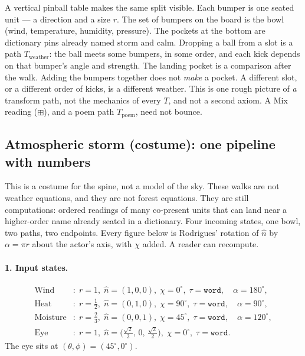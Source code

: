 \documentclass[12pt, a4paper]{article}
\begin{document}
A vertical pinball table makes the same split visible. Each bumper
is one seated unit --- a direction and a size \(r\). The set of
bumpers on the board is the bowl (wind, temperature, humidity,
pressure). The pockets at the bottom are dictionary pins already
named \(\mathrm{storm}\) and \(\mathrm{calm}\). Dropping a ball from
a slot is a path \(T_{\mathrm{weather}}\): the ball meets some
bumpers, in some order, and each kick depends on that bumper's
angle and strength. The landing pocket is a comparison after the
walk. Adding the bumpers together does not \emph{make} a pocket.
A different slot, or a different order of kicks, is a different
weather. This is one rough picture of \emph{a} transform path, not
the mechanics of every $T$, and not a second axiom. A Mix reading ($\boxplus$), and a poem path $T_{\mathrm{poem}}$, need not bounce.

\subsection{Atmospheric storm (costume): one pipeline with numbers}
\label{subsec:storm_pipeline}
This is a costume for the spine, not a model of the sky.
These walks are not weather equations, and they are not forest
equations. They are still computations: ordered readings of many
co-present units that can land near a higher-order name already
seated in a dictionary.
Four incoming
states, one bowl, two paths, two endpoints. Every figure below is
Rodrigues' rotation of $\hat n$ by $\alpha=\pi r$ about the actor's
axis, with $\chi$ added. A reader can recompute.

\paragraph{1. Input states.}
\begin{align*}
\mathrm{Wind}&:
  \; r=1,\;
  \hat n=(1,0,0),\;
  \chi=0^\circ,\;
  \tau=\mathtt{word},
  \quad \alpha=180^\circ,\\
\mathrm{Heat}&:
  \; r=\tfrac12,\;
  \hat n=(0,1,0),\;
  \chi=90^\circ,\;
  \tau=\mathtt{word},
  \quad \alpha=90^\circ,\\
\mathrm{Moisture}&:
  \; r=\tfrac23,\;
  \hat n=(0,0,1),\;
  \chi=45^\circ,\;
  \tau=\mathtt{word},
  \quad \alpha=120^\circ,\\
\mathrm{Eye}&:
  \; r=1,\;
  \hat n=\bigl(\tfrac{\sqrt{2}}{2},\,0,\,\tfrac{\sqrt{2}}{2}\bigr),\;
  \chi=0^\circ,\;
  \tau=\mathtt{word}.
\end{align*}
The eye sits at $(\theta,\phi)=(45^\circ,0^\circ)$.
\end{document}
